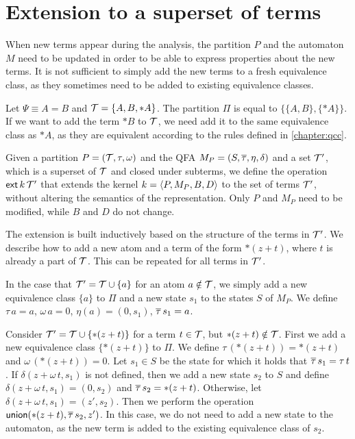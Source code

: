\section{Extension to a superset of terms}

When new terms appear during the analysis, the partition $P$ and the automaton $M$ need to be updated
in order to be able to express properties about the new terms.
It is not sufficient to simply add the new terms to a fresh equivalence class,
as they sometimes need to be added to existing equivalence classes.

\begin{example}
    Let $\Psi \equiv A = B$ and $\mathcal{T} = \{A, B, *A\}$.
    The partition $\Pi$ is equal to $\{\{A, B\}, \{*A\}\}$.
    If we want to add the term $*B$ to $\mathcal{T}$, we need add it to the same equivalence class as $*A$,
    as they are equivalent according to the rules defined in \cref{chapter:qcc}.
\end{example}

Given a partition $P = (\mathcal{T}, \tau, \omega)$ and the QFA $M_P = (S, \overline{\tau}, \eta, \delta)$ and a set $\mathcal{T}'$, which is a superset of $\mathcal{T}$ and closed under subterms,
we define the operation $\textsf{ext}\,{k}\,{\mathcal{T}'}$ that extends the kernel $k = \langle P, M_P, B, D\rangle$ to the set of terms $\mathcal{T}'$,
without altering the semantics of the representation.
Only $P$ and $M_P$ need to be modified, while $B$ and $D$ do not change.

The extension is built inductively based on the structure of the terms in $\mathcal{T}'$.
We describe how to add a new atom and a term of the form $*(z+t)$, where $t$ is already a part of $\mathcal{T}$.
This can be repeated for all terms in $\mathcal{T}'$.

In the case that $\mathcal{T}' = \mathcal{T} \cup \{a\}$ for an atom $a \notin \mathcal{T}$, we simply add a new
equivalence class $\{a\}$ to $\Pi$ and a new state $s_1$ to the states $S$ of $M_P$.
We define $\tau\,a = a$, $\omega\,a=0$, $\eta(a) = (0,s_1)$, $\overline{\tau}\,s_1 = a$.

Consider $\mathcal{T}' = \mathcal{T} \cup \{*(z+t)\}$ for a term $t \in \mathcal{T}$, but $*(z + t) \notin \mathcal{T}$.
First we add a new equivalence class $\{*(z+t)\}$ to $\Pi$.
We define $\tau\,(*(z+t)) = *(z+t)$ and $\omega\,(*(z+t))=0$.
Let $s_1 \in S$ be the state for which it holds that $\overline{\tau}\,s_1 = \tau\,t$.
If $\delta(z + \omega\,t,s_1)$ is not defined, then we add a new state $s_2$ to $S$
and define $\delta(z + \omega\,t, s_1) = (0, s_2)$ and $\overline{\tau}\,s_2 = *(z+t)$.
Otherwise, let $\delta(z + \omega\,t, s_1) = (z', s_2)$.
Then we perform the operation $\textsf{union}(*(z + t), \overline{\tau}\,s_2, z')$.
In this case, we do not need to add a new state to the automaton,
as the new term is added to the existing equivalence class of $s_2$.
